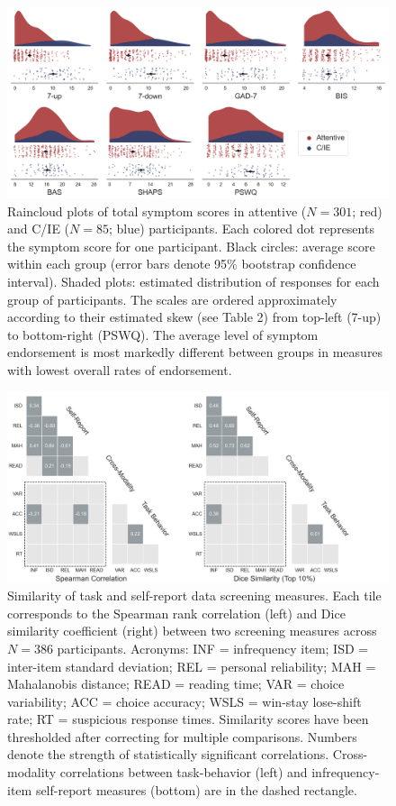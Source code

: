\documentclass[a4paper,notitlepage,12pt]{article}
\begin{document}
\begin{refsection}[main]
\clearpage
\begin{figure}[h]
    \includegraphics[width=16cm]{../figures/main_02a.png}
    \centering
    \captionsetup{width=0.88\textwidth}
    \caption{Raincloud plots of total symptom scores in attentive ($N=301$; red) and C/IE ($N=85$; blue) participants. Each colored dot represents the symptom score for one participant. Black circles: average score within each group (error bars denote 95\% bootstrap confidence interval). Shaded plots: estimated distribution of responses for each group of participants. The scales are ordered approximately according to their estimated skew (see Table 2) from top-left (7-up) to bottom-right (PSWQ). The average level of symptom endorsement is most markedly different between groups in measures with lowest overall rates of endorsement.}
    \label{fig:distributions}
\end{figure}

\clearpage
\begin{figure}[h]
    \includegraphics[width=16cm, trim=0 0 3cm 0]{../figures/main_02b.png}
    \centering
    \captionsetup{width=0.88\textwidth}
    \caption{Similarity of task and self-report data screening measures. Each tile corresponds to the Spearman rank correlation (left) and Dice similarity coefficient (right) between two screening measures across $N=386$ participants. Acronyms: INF = infrequency item; ISD = inter-item standard deviation; REL = personal reliability; MAH = Mahalanobis distance; READ = reading time; VAR = choice variability; ACC = choice accuracy; WSLS = win-stay lose-shift rate; RT = suspicious response times. Similarity scores have been thresholded after correcting for multiple comparisons. Numbers denote the strength of statistically significant correlations. Cross-modality correlations between task-behavior (left) and infrequency-item self-report measures (bottom) are in the dashed rectangle.}
    \label{fig:correspondence}
\end{figure}


\end{refsection}
\end{document}
